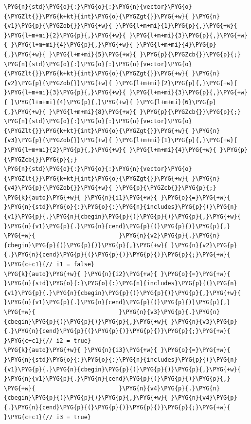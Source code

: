 \begin{itemize}
\begin{codeblockbg}
\begin{Verbatim}[commandchars=\\\{\},breaklines=true,breakanywhere=true,fontsize=\codefont,xleftmargin=17bp]
\PYG{n}{std}\PYG{o}{:}\PYG{o}{:}\PYG{n}{vector}\PYG{o}{\PYGZlt{}}\PYG{k+kt}{int}\PYG{o}{\PYGZgt{}}\PYG{+w}{ }\PYG{n}{v1}\PYG{p}{\PYGZob{}}\PYG{+w}{ }\PYG{l+m+mi}{1}\PYG{p}{,}\PYG{+w}{ }\PYG{l+m+mi}{2}\PYG{p}{,}\PYG{+w}{ }\PYG{l+m+mi}{3}\PYG{p}{,}\PYG{+w}{ }\PYG{l+m+mi}{4}\PYG{p}{,}\PYG{+w}{ }\PYG{l+m+mi}{4}\PYG{p}{,}\PYG{+w}{ }\PYG{l+m+mi}{5}\PYG{+w}{ }\PYG{p}{\PYGZcb{}}\PYG{p}{;}
\PYG{n}{std}\PYG{o}{:}\PYG{o}{:}\PYG{n}{vector}\PYG{o}{\PYGZlt{}}\PYG{k+kt}{int}\PYG{o}{\PYGZgt{}}\PYG{+w}{ }\PYG{n}{v2}\PYG{p}{\PYGZob{}}\PYG{+w}{ }\PYG{l+m+mi}{2}\PYG{p}{,}\PYG{+w}{ }\PYG{l+m+mi}{3}\PYG{p}{,}\PYG{+w}{ }\PYG{l+m+mi}{3}\PYG{p}{,}\PYG{+w}{ }\PYG{l+m+mi}{4}\PYG{p}{,}\PYG{+w}{ }\PYG{l+m+mi}{6}\PYG{p}{,}\PYG{+w}{ }\PYG{l+m+mi}{8}\PYG{+w}{ }\PYG{p}{\PYGZcb{}}\PYG{p}{;}
\PYG{n}{std}\PYG{o}{:}\PYG{o}{:}\PYG{n}{vector}\PYG{o}{\PYGZlt{}}\PYG{k+kt}{int}\PYG{o}{\PYGZgt{}}\PYG{+w}{ }\PYG{n}{v3}\PYG{p}{\PYGZob{}}\PYG{+w}{ }\PYG{l+m+mi}{1}\PYG{p}{,}\PYG{+w}{ }\PYG{l+m+mi}{2}\PYG{p}{,}\PYG{+w}{ }\PYG{l+m+mi}{4}\PYG{+w}{ }\PYG{p}{\PYGZcb{}}\PYG{p}{;}
\PYG{n}{std}\PYG{o}{:}\PYG{o}{:}\PYG{n}{vector}\PYG{o}{\PYGZlt{}}\PYG{k+kt}{int}\PYG{o}{\PYGZgt{}}\PYG{+w}{ }\PYG{n}{v4}\PYG{p}{\PYGZob{}}\PYG{+w}{ }\PYG{p}{\PYGZcb{}}\PYG{p}{;}
\PYG{k}{auto}\PYG{+w}{ }\PYG{n}{i1}\PYG{+w}{ }\PYG{o}{=}\PYG{+w}{ }\PYG{n}{std}\PYG{o}{:}\PYG{o}{:}\PYG{n}{includes}\PYG{p}{(}\PYG{n}{v1}\PYG{p}{.}\PYG{n}{cbegin}\PYG{p}{(}\PYG{p}{)}\PYG{p}{,}\PYG{+w}{ }\PYG{n}{v1}\PYG{p}{.}\PYG{n}{cend}\PYG{p}{(}\PYG{p}{)}\PYG{p}{,}
\PYG{+w}{                        }\PYG{n}{v2}\PYG{p}{.}\PYG{n}{cbegin}\PYG{p}{(}\PYG{p}{)}\PYG{p}{,}\PYG{+w}{ }\PYG{n}{v2}\PYG{p}{.}\PYG{n}{cend}\PYG{p}{(}\PYG{p}{)}\PYG{p}{)}\PYG{p}{;}\PYG{+w}{ }\PYG{c+c1}{// i1 = false}
\PYG{k}{auto}\PYG{+w}{ }\PYG{n}{i2}\PYG{+w}{ }\PYG{o}{=}\PYG{+w}{ }\PYG{n}{std}\PYG{o}{:}\PYG{o}{:}\PYG{n}{includes}\PYG{p}{(}\PYG{n}{v1}\PYG{p}{.}\PYG{n}{cbegin}\PYG{p}{(}\PYG{p}{)}\PYG{p}{,}\PYG{+w}{ }\PYG{n}{v1}\PYG{p}{.}\PYG{n}{cend}\PYG{p}{(}\PYG{p}{)}\PYG{p}{,}
\PYG{+w}{                        }\PYG{n}{v3}\PYG{p}{.}\PYG{n}{cbegin}\PYG{p}{(}\PYG{p}{)}\PYG{p}{,}\PYG{+w}{ }\PYG{n}{v3}\PYG{p}{.}\PYG{n}{cend}\PYG{p}{(}\PYG{p}{)}\PYG{p}{)}\PYG{p}{;}\PYG{+w}{ }\PYG{c+c1}{// i2 = true}
\PYG{k}{auto}\PYG{+w}{ }\PYG{n}{i3}\PYG{+w}{ }\PYG{o}{=}\PYG{+w}{ }\PYG{n}{std}\PYG{o}{:}\PYG{o}{:}\PYG{n}{includes}\PYG{p}{(}\PYG{n}{v1}\PYG{p}{.}\PYG{n}{cbegin}\PYG{p}{(}\PYG{p}{)}\PYG{p}{,}\PYG{+w}{ }\PYG{n}{v1}\PYG{p}{.}\PYG{n}{cend}\PYG{p}{(}\PYG{p}{)}\PYG{p}{,}
\PYG{+w}{                        }\PYG{n}{v4}\PYG{p}{.}\PYG{n}{cbegin}\PYG{p}{(}\PYG{p}{)}\PYG{p}{,}\PYG{+w}{ }\PYG{n}{v4}\PYG{p}{.}\PYG{n}{cend}\PYG{p}{(}\PYG{p}{)}\PYG{p}{)}\PYG{p}{;}\PYG{+w}{ }\PYG{c+c1}{// i3 = true}
\end{Verbatim}
\end{codeblockbg}

\end{itemize}


